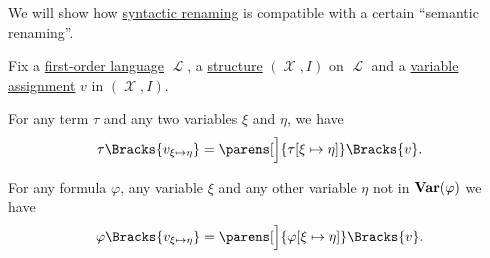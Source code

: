 \begin{proposition}\label{thm:renaming_assignment_compatibility}
  We will show how \hyperref[rem:first_order_substitution_renaming_justification]{syntactic renaming} is compatible with a certain \enquote{semantic renaming}.

  Fix a \hyperref[def:first_order_syntax]{first-order language} \( \mscrL \), a \hyperref[def:first_order_structure]{structure} \( (\mscrX, I) \) on \( \mscrL \) and a \hyperref[def:first_order_valuation/variable_assignment]{variable assignment} \( v \) in \( (\mscrX, I) \).

  \begin{thmenum}
     For any term \( \tau \) and any two variables \( \xi \) and \( \eta \), we have
    \begin{equation}\label{eq:thm:renaming_assignment_compatibility/terms}
      \tau\Bracks{v_{\xi \mapsto \eta}}
      =
      \parens[\Big]{ \tau[\xi \mapsto \eta] }\Bracks{v}.
    \end{equation}

     For any formula \( \varphi \), any variable \( \xi \) and any other variable \( \eta \) not in \( \operatorname{\mathbf{Var}}(\varphi) \) we have
    \begin{equation}\label{eq:thm:renaming_assignment_compatibility/formulas}
      \varphi\Bracks{v_{\xi \mapsto \eta}}
      =
      \parens[\Big]{ \varphi[\xi \mapsto \eta] }\Bracks{v}.
    \end{equation}
  \end{thmenum}
\end{proposition}
